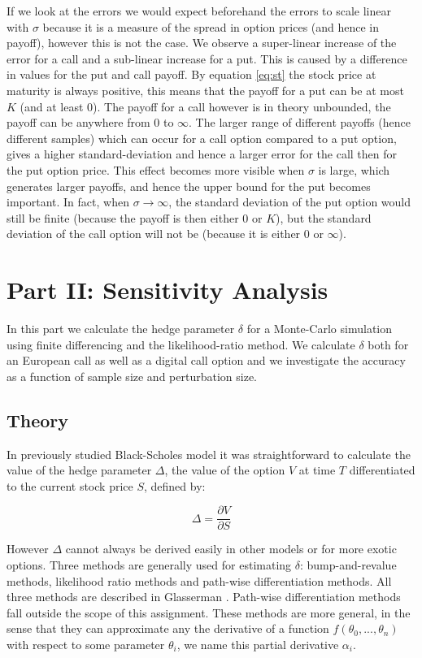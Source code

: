 \documentclass[11pt,a4paper]{article}
\begin{document}
If we look at the errors we would expect beforehand the errors to scale linear with $\sigma$ because it is a measure of the spread in option prices (and hence in payoff), however this is not the case. We observe a super-linear increase of the error for a call and a sub-linear increase for a put. This is caused by a difference in values for the put and call payoff. By equation \ref{eq:st} the stock price at maturity is always positive, this means that the payoff for a put can be at most $K$ (and at least 0). The payoff for a call however is in theory unbounded, the payoff can be anywhere from 0 to $\infty$. The larger range of different payoffs (hence different samples) which can occur for a call option compared to a put option, gives a higher standard-deviation and hence a larger error for the call then for the put option price. This effect becomes more visible when $\sigma$ is large, which generates larger payoffs, and hence the upper bound for the put becomes important. In fact, when $\sigma \rightarrow \infty$, the standard deviation of the put option would still be finite (because the payoff is then either 0 or $K$), but the standard deviation of the call option will not be (because it is either 0 or $\infty$).

\newpage

\section{Part II: Sensitivity Analysis}
In this part we calculate the hedge parameter $\delta$ for a Monte-Carlo simulation using finite differencing and the likelihood-ratio method. We calculate $\delta$ both for an European call as well as a digital call option and we investigate the accuracy as a function of sample size and perturbation size.

\subsection{Theory}

In previously studied Black-Scholes model it was straightforward to calculate the value of the hedge parameter $\Delta$, the value of the option $V$ at time $T$ differentiated to the current stock price $S$, defined by:

\begin{equation}
  \label{eq:delta}
  \Delta = \frac{\partial V}{\partial S}
\end{equation}

However $\Delta$ cannot always be derived easily in other models or for more exotic options. Three methods are generally used for estimating $\delta$: bump-and-revalue methods, likelihood ratio methods and path-wise differentiation methods. All three methods are described in Glasserman \cite{Glasserman}. Path-wise differentiation methods fall outside the scope of this assignment. These methods are more general, in the sense that they can approximate any the derivative of a function $f(\theta_0,...,\theta_n)$ with respect to some parameter $\theta_i$, we name this partial derivative $\alpha_i$.
\end{document}
